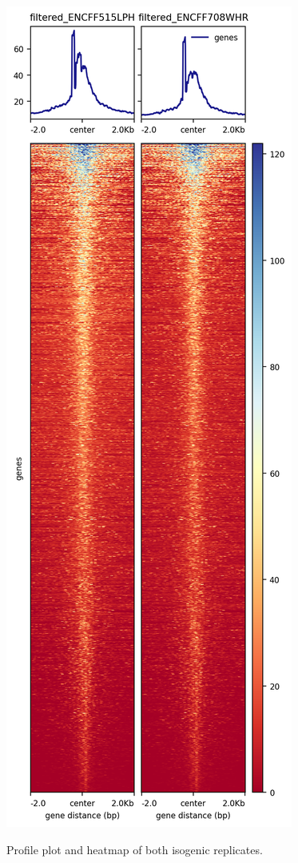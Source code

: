 \documentclass{article}
\begin{document}
\begin{figure}[h]
\caption{Profile plot and heatmap of both isogenic replicates.}
\centering
\includegraphics[height=\textheight]{heatmap.png}
\label{fig:heatmap}
\end{figure}
\end{document}
